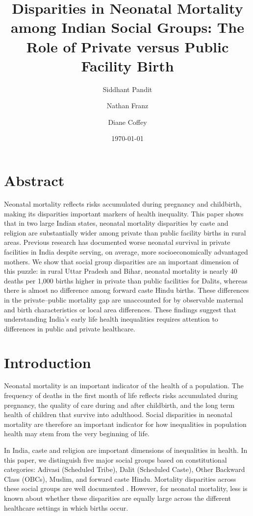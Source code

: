 \documentclass[12pt]{article}
\title{\large \textbf{Disparities in Neonatal Mortality among Indian Social Groups: The Role of Private versus Public Facility Birth}}
\author[1]{Siddhant Pandit}
\author[2]{Nathan Franz}
\author[1,3]{Diane Coffey}
\affil[1]{Population Research Center, The University of Texas at Austin}
\affil[2]{Population Studies Center, University of Michigan}
\affil[3]{Department of Sociology, The University of Texas at Austin}
\date{\today}
\begin{document}
\doublespacing
\setlength{\parskip}{0pt}

\maketitle



\section{Abstract}

Neonatal mortality reflects risks accumulated during pregnancy and childbirth, making its disparities important markers of health inequality. This paper shows that in two large Indian states, neonatal mortality disparities by caste and religion are substantially wider among private than public facility births in rural areas. Previous research has documented worse neonatal survival in private facilities in India despite serving, on average, more socioeconomically advantaged mothers. We show that social group disparities are an important dimension of this puzzle: in rural Uttar Pradesh and Bihar, neonatal mortality is nearly 40 deaths per 1,000 births higher in private than public facilities for Dalits, whereas there is almost no difference among forward caste Hindu births. These differences in the private–public mortality gap are unaccounted for by observable maternal and birth characteristics or local area differences. These findings suggest that understanding India’s early life health inequalities requires attention to differences in public and private healthcare. 




\section{Introduction}

Neonatal mortality is an important indicator of the health of a population. The frequency of deaths in the first month of life reflects risks accumulated during pregnancy, the quality of care during and after childbirth, and the long term health of children that survive into adulthood. Social disparities in neonatal mortality are therefore an important indicator for how inequalities in population health may stem from the very beginning of life.

In India, caste and religion are important dimensions of inequalities in health. In this paper, we distinguish five major social groups based on constitutional categories: Adivasi (Scheduled Tribe), Dalit (Scheduled Caste), Other Backward Class (OBCs), Muslim, and forward caste Hindu. Mortality disparities across these social groups are well documented \citep{gupta2022large, gupta2022social}. However, for neonatal mortality, less is known about whether these disparities are equally large across the different healthcare settings in which births occur. 
\end{document}
